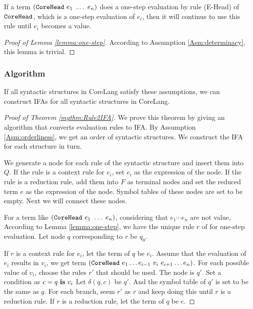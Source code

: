 \begin{lemma}
\label{lemma:one-step}
If a term $(\mbox{\tt CoreHead}~e_1~\ldots~e_n)$ does a one-step evaluation by rule (E-Head) of $\mbox{\tt CoreHead}$, which is a one-step evaluation of $e_i$, then it will continue to use this rule until $e_i$ becomes a value.
\end{lemma}

\begin{proof}[Proof of Lemma \ref{lemma:one-step}]
According to Assumption \ref{Asm:determinacy}, this lemma is trivial.
\end{proof}

\subsubsection{Algorithm}

\begin{mythm}
\label{mythm:Rule2IFA}
If all syntactic structures in CoreLang satisfy these assumptions, we can construct IFAs for all syntactic structures in CoreLang.
\end{mythm}

\begin{proof}[Proof of Theorem \ref{mythm:Rule2IFA}]

We prove this theorem by giving an algorithm that converts evaluation rules to IFA. By Assumption \ref{Asm:orderliness}, we get an order of syntactic structures. We construct the IFA for each structure in turn.

We generate a node for each rule of the syntactic structure  and insert them into $Q$. If the rule is a context rule for $e_i$, set $e_i$ as the expression of the node. If the rule is a reduction rule, add them into $F$ as terminal nodes and set the reduced term $e$ as the expression of the node. Symbol tables of these nodes are set to be empty. Next we will connect these nodes.

For a term like $(\mbox{\tt CoreHead}~e_1~\ldots~e_n)$, considering that $e_1\cdots e_n$ are not value, According to Lemma \ref{lemma:one-step}, we have the unique rule $r$ of  for one-step evaluation. Let node $q$ corresponding to $r$ be $q_0$.

If $r$ is a context rule for $e_i$, let the term of $q$ be $e_i$. Assume that the evaluation of $e_i$ results in $v_i$, we get term $(\mbox{\tt CoreHead}~e_1 \ldots e_{i-1}~v_i~e_{i+1} \ldots e_n)$. For each possible value of $v_i$, choose the rules $r'$ that should be used. The node is $q'$. Set a condition as $c=q~\mbox{\rm \bf is}~v_i$ Let $\delta(q, c)$ be $q'$. And the symbol table of $q'$ is set to be the same as $q$. For each branch, seem $r'$ as $r$ and keep doing this until $r$ is a reduction rule. If $r$ is a reduction rule, let the term of $q$ be $e$.


\end{proof}

